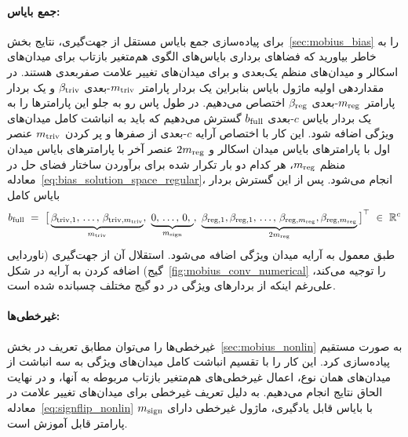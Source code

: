 \paragraph{جمع بایاس:}
برای پیاده‌سازی جمع بایاس مستقل از جهت‌گیری، نتایج بخش~\ref{sec:mobius_bias} را به خاطر بیاورید که فضاهای برداری بایاس‌های الگوی هم‌متغیر بازتاب برای میدان‌های اسکالر و میدان‌های منظم یک‌بعدی و برای میدان‌های تغییر علامت صفربعدی هستند.
در مقداردهی اولیه ماژول بایاس بنابراین یک بردار پارامتر $m_{\textup{triv}}$-بعدی $\beta_{\textup{triv}}$ و یک بردار پارامتر $m_{\textup{reg}}$-بعدی $\beta_{\textup{reg}}$ اختصاص می‌دهیم.
در طول پاس رو به جلو این پارامترها را به یک بردار بایاس $c$-بعدی $b_{\textup{full}}$ گسترش می‌دهیم که باید به انباشت کامل میدان‌های ویژگی اضافه شود.
این کار با اختصاص آرایه $c$-بعدی از صفرها و پر کردن $m_{\textup{triv}}$ عنصر اول با پارامترهای بایاس میدان اسکالر و $2m_{\textup{reg}}$ عنصر آخر با پارامترهای بایاس میدان منظم $m_{\textup{reg}}$، هر کدام دو بار تکرار شده برای برآوردن ساختار فضای حل در معادله~\eqref{eq:bias_solution_space_regular}، انجام می‌شود.
پس از این گسترش بردار بایاس کامل
\begin{align}
	b_{\textup{full}}\ =\ \big[
	\underbrace{
		\beta_{\textup{triv},1}, \,\dots,\, \beta_{\textup{triv}, m_{\textup{triv}}}
	}_{m_{\textup{triv}}},\ 
	\underbrace{
		0, \,\dots,\, 0,\ 
	}_{m_{\textup{sign}}},\ 
	\underbrace{
		\beta_{\textup{reg},1},\beta_{\textup{reg},1}, \,\dots,\, \beta_{\textup{reg}, m_{\textup{reg}}}, \beta_{\textup{reg}, m_{\textup{reg}}}
	}_{2m_{\textup{reg}}}
	\big]^\top \ \in\ \R^c
\end{align}
طبق معمول به آرایه میدان ویژگی اضافه می‌شود.
استقلال آن از جهت‌گیری (ناوردایی گیج) اضافه کردن به آرایه در شکل~\ref{fig:mobius_conv_numerical} را توجیه می‌کند، علی‌رغم اینکه از بردارهای ویژگی در دو گیج مختلف چسبانده شده است.



\paragraph{غیرخطی‌ها:}
غیرخطی‌ها را می‌توان مطابق تعریف در بخش~\ref{sec:mobius_nonlin} به صورت مستقیم پیاده‌سازی کرد.
این کار را با تقسیم انباشت کامل میدان‌های ویژگی به سه انباشت از میدان‌های همان نوع، اعمال غیرخطی‌های هم‌متغیر بازتاب مربوطه به آنها، و در نهایت الحاق نتایج انجام می‌دهیم.
به دلیل تعریف غیرخطی برای میدان‌های تغییر علامت در معادله~\eqref{eq:signflip_nonlin} با بایاس قابل یادگیری، ماژول غیرخطی دارای $m_{\textup{sign}}$ پارامتر قابل آموزش است.




